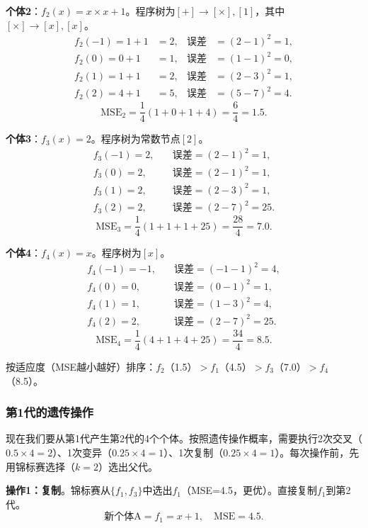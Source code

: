 \documentclass[lang=cn,zihao=-4,a4paper,fontset=windows]{beautybook}
\begin{document}
\textbf{个体2}：$f_2(x) = x \times x + 1$。程序树为$[+] \to [\times], [1]$，其中$[\times] \to [x], [x]$。
\begin{align*}
f_2(-1) = 1 + 1 &= 2, & \text{误差} &= (2-1)^2 = 1, \\
f_2(0) = 0 + 1 &= 1, & \text{误差} &= (1-1)^2 = 0, \\
f_2(1) = 1 + 1 &= 2, & \text{误差} &= (2-3)^2 = 1, \\
f_2(2) = 4 + 1 &= 5, & \text{误差} &= (5-7)^2 = 4.
\end{align*}
\[
\text{MSE}_2 = \frac{1}{4}(1 + 0 + 1 + 4) = \frac{6}{4} = 1.5.
\]

\textbf{个体3}：$f_3(x) = 2$。程序树为常数节点$[2]$。
\begin{align*}
f_3(-1) = 2, & \quad \text{误差} = (2-1)^2 = 1, \\
f_3(0) = 2, & \quad \text{误差} = (2-1)^2 = 1, \\
f_3(1) = 2, & \quad \text{误差} = (2-3)^2 = 1, \\
f_3(2) = 2, & \quad \text{误差} = (2-7)^2 = 25.
\end{align*}
\[
\text{MSE}_3 = \frac{1}{4}(1 + 1 + 1 + 25) = \frac{28}{4} = 7.0.
\]

\textbf{个体4}：$f_4(x) = x$。程序树为$[x]$。
\begin{align*}
f_4(-1) = -1, & \quad \text{误差} = (-1-1)^2 = 4, \\
f_4(0) = 0, & \quad \text{误差} = (0-1)^2 = 1, \\
f_4(1) = 1, & \quad \text{误差} = (1-3)^2 = 4, \\
f_4(2) = 2, & \quad \text{误差} = (2-7)^2 = 25.
\end{align*}
\[
\text{MSE}_4 = \frac{1}{4}(4 + 1 + 4 + 25) = \frac{34}{4} = 8.5.
\]

按适应度（MSE越小越好）排序：$f_2$（1.5）$> f_1$（4.5）$> f_3$（7.0）$> f_4$（8.5）。

\subsubsection{第1代的遗传操作}

现在我们要从第1代产生第2代的4个个体。按照遗传操作概率，需要执行2次交叉（$0.5 \times 4 = 2$）、1次变异（$0.25 \times 4 = 1$）、1次复制（$0.25 \times 4 = 1$）。每次操作前，先用锦标赛选择（$k = 2$）选出父代。

\textbf{操作1：复制}。锦标赛从$\{f_1, f_3\}$中选出$f_1$（MSE=4.5，更优）。直接复制$f_1$到第2代。
\[
\text{新个体A} = f_1 = x + 1, \quad \text{MSE} = 4.5.
\]
\end{document}
